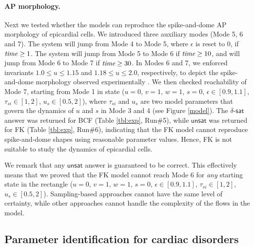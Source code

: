 \paragraph{AP morphology.}
Next we tested whether the models can reproduce the spike-and-dome AP morphology of epicardial cells. We introduced three auxiliary modes (Mode 5, 6 and 7). The system will jump from Mode 4 to Mode 5, where $\epsilon$ is reset to $0$, if $\text{\em time} \ge 1$. The system will jump from Mode 5 to Mode 6 if $\text{\em time} \ge 10$, and will jump from Mode 6 to Mode 7 if $\text{\em time} \ge 30$. In Modes 6 and 7, we enforced invariants $1.0 \le u \le 1.15$ and $1.18 \le u \le 2.0$, respectively, to depict the spike-and-dome morphology observed experimentally \cite{nabauer96}. We then checked reachability of Mode 7, starting from Mode 1 in state ($u = 0$, $v = 1$, $w = 1$, $s = 0$, $\epsilon \in [0.9,1.1]$, $\tau_{si} \in [1,2]$, $u_s \in [0.5,2]$),
where $\tau_{si}$ and $u_s$ are two model parameters that govern the dynamics of $u$ and $s$ in
Mode 3 and 4 (see Figure \ref{model}).
The $\delta$-$\mathsf{sat}$ answer
was returned for BCF  (Table \ref{tbl:exp}, Run\#5), while $\mathsf{unsat}$ was returned for FK (Table \ref{tbl:exp}, Run\#6), indicating that the FK model cannot reproduce spike-and-dome shapes using reasonable parameter values. Hence, FK is not suitable to study the dynamics of epicardial cells.

We remark that any $\mathsf{unsat}$ answer is guaranteed to be correct. This effectively
means that we proved that the FK model cannot reach Mode 6 for {\em any} starting state in the
rectangle ($u = 0$, $v = 1$, $w = 1$, $s = 0$, $\epsilon \in [0.9,1.1]$, $\tau_{si} \in [1,2]$,
$u_s \in [0.5,2]$). Sampling-based approaches cannot have the same level of certainty, while other
approaches cannot handle the complexity of the flows in the model.


\subsection{Parameter identification for cardiac disorders}


